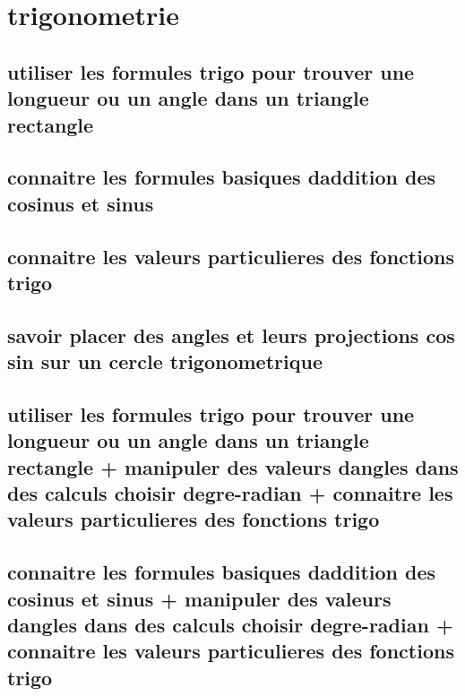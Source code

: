 \documentclass[11pt]{article}
\begin{document}
\tableofcontents
  \section{trigonometrie}
    \subsection{utiliser les formules trigo pour trouver une longueur ou un angle dans un triangle rectangle}
      
    \subsection{connaitre les formules basiques daddition des cosinus et sinus}
      
      
    \subsection{connaitre les valeurs particulieres des fonctions trigo}
      
    \subsection{savoir placer des angles et leurs projections cos  sin sur un cercle trigonometrique}
      
    \subsection{utiliser les formules trigo pour trouver une longueur ou un angle dans un triangle rectangle + manipuler des valeurs dangles dans des calculs choisir degre-radian + connaitre les valeurs particulieres des fonctions trigo}
      
    \subsection{connaitre les formules basiques daddition des cosinus et sinus + manipuler des valeurs dangles dans des calculs choisir degre-radian + connaitre les valeurs particulieres des fonctions trigo}
      
\end{document}
